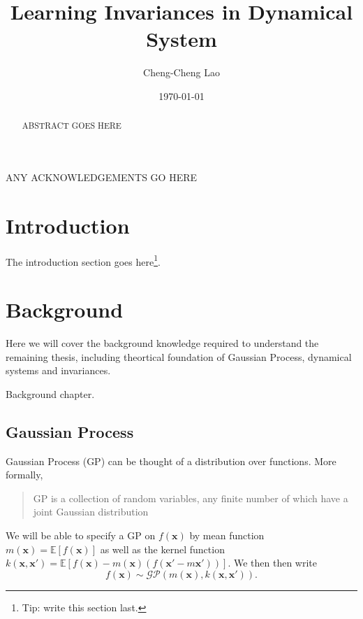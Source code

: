 \documentclass{statsmsc}
\title{Learning Invariances in Dynamical System}
\author{Cheng-Cheng Lao}
\date{\today}
\begin{document}
\maketitle


\declarationdate{\today}
\declaration 


\begin{abstract}
    ABSTRACT GOES HERE
\end{abstract}

\begin{acknowledgements}
    ANY ACKNOWLEDGEMENTS GO HERE
\end{acknowledgements}


\mainmatter


\chapter{Introduction}

The introduction section goes here\footnote{Tip: write this section last.}.

\chapter{Background}
Here we will cover the background knowledge required to understand the remaining thesis, including theortical foundation of Gaussian Process, dynamical systems and invariances. 

Background chapter.

\section{Gaussian Process}
Gaussian Process (GP) can be thought of a distribution over functions. \cite{rasmussen_williams_2006}
More formally, \begin{quote}GP is a collection of random variables, any finite number of which have a joint Gaussian distribution\end{quote}
We will be able to specify a GP on $f(\mathbf{x})$ by mean function $m(\mathbf{x})=\mathbb{E}[f(\mathbf{x})]$ as well as the kernel function $k(\mathbf{x}, \mathbf{x'})=\mathbb{E}[f(\mathbf{x})-m(\mathbf{x})(f(\mathbf{x'}-m{\mathbf{x'}}))]$.
We then then write
$$
f(\mathbf{x})\sim\mathcal{GP}(m(\mathbf{x}),k(\mathbf{x},\mathbf{x'})).
$$
\end{document}
